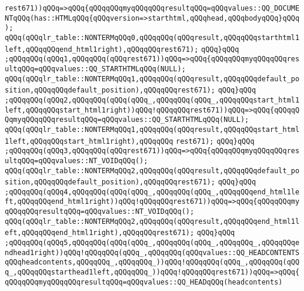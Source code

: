 \verb|rest671))qQQq=>qQQq{qQQqqQQqmyqQQqqQQqresultqQQq=qQQqvalues::QQ_DOCUMENTqQQq(has::HTMLqQQq{qQQqversion=>starthtml,qQQqhead,qQQqbodyqQQq}qQQq);|\newline
\verb|qQQq(qQQqlr_table::NONTERMqQQq0,qQQqqQQq(qQQqresult,qQQqqQQqstarthtml1left,qQQqqQQqend_html1right),qQQqqQQqrest671);|\newline
\verb|qQQq}qQQq|\newline
\verb|;qQQqqQQq(qQQq1,qQQqqQQq(qQQqrest671))qQQq=>qQQq{qQQqqQQqmyqQQqqQQqresultqQQq=qQQqvalues::QQ_STARTHTMLqQQq(NULL);|\newline
\verb|qQQq(qQQqlr_table::NONTERMqQQq1,qQQqqQQq(qQQqresult,qQQqqQQqdefault_position,qQQqqQQqdefault_position),qQQqqQQqrest671);|\newline
\verb|qQQq}qQQq|\newline
\verb|;qQQqqQQq(qQQq2,qQQqqQQq(qQQq(qQQq_,qQQqqQQq(qQQq_,qQQqqQQqstart_html1left,qQQqqQQqstart_html1right))qQQq!qQQqqQQqrest671))qQQq=>qQQq{qQQqqQQqmyqQQqqQQqresultqQQq=qQQqvalues::QQ_STARTHTMLqQQq(NULL);|\newline
\verb|qQQq(qQQqlr_table::NONTERMqQQq1,qQQqqQQq(qQQqresult,qQQqqQQqstart_html1left,qQQqqQQqstart_html1right),qQQqqQQq|\newline
\verb|rest671);|\newline
\verb|qQQq}qQQq|\newline
\verb|;qQQqqQQq(qQQq3,qQQqqQQq(qQQqrest671))qQQq=>qQQq{qQQqqQQqmyqQQqqQQqresultqQQq=qQQqvalues::NT_VOIDqQQq();|\newline
\verb|qQQq(qQQqlr_table::NONTERMqQQq2,qQQqqQQq(qQQqresult,qQQqqQQqdefault_position,qQQqqQQqdefault_position),qQQqqQQqrest671);|\newline
\verb|qQQq}qQQq|\newline
\verb|;qQQqqQQq(qQQq4,qQQqqQQq(qQQq(qQQq_,qQQqqQQq(qQQq_,qQQqqQQqend_html1left,qQQqqQQqend_html1right))qQQq!qQQqqQQqrest671))qQQq=>qQQq{qQQqqQQqmyqQQqqQQqresultqQQq=qQQqvalues::NT_VOIDqQQq();|\newline
\verb|qQQq(qQQqlr_table::NONTERMqQQq2,qQQqqQQq(qQQqresult,qQQqqQQqend_html1left,qQQqqQQqend_html1right),qQQqqQQqrest671);|\newline
\verb|qQQq}qQQq|\newline
\verb|;qQQqqQQq(qQQq5,qQQqqQQq(qQQq(qQQq_,qQQqqQQq(qQQq_,qQQqqQQq_,qQQqqQQqendhead1right))qQQq!qQQqqQQq(qQQq_,qQQqqQQq(qQQqvalues::QQ_HEADCONTENTSqQQqheadcontents,qQQqqQQq_,qQQqqQQq_))qQQq!qQQqqQQq(qQQq_,qQQqqQQq(qQQq_,qQQqqQQqstarthead1left,qQQqqQQq_))qQQq!qQQqqQQqrest671))qQQq=>qQQq{qQQqqQQqmyqQQqqQQqresultqQQq=qQQqvalues::QQ_HEADqQQq(headcontents)|\newline
